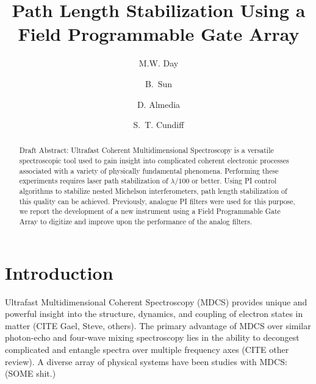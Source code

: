 \documentclass[letterpaper,12pt,amsmath,reprint,aip,jmp,onecolumn]{revtex4-1}
\begin{document}
\title{Path Length Stabilization Using a Field Programmable Gate Array}
\author{M.W. Day}
\author{B.~Sun}%
%

\author{D. Almedia}


\author{S.~T. Cundiff}

\begin{abstract}
Draft Abstract: Ultrafast Coherent Multidimensional Spectroscopy is a versatile spectroscopic tool used to gain insight into complicated coherent electronic processes associated with a variety of physically fundamental phenomena. Performing these experiments requires laser path stabilization of $\lambda / 100$ or better. Using PI control algorithms to stabilize nested Michelson interferometers, path length stabilization of this quality can be achieved. Previously, analogue PI filters were used for this purpose, we report the development of a new instrument using a Field Programmable Gate Array to digitize and improve upon the performance of the analog filters.
\end{abstract}
\maketitle

\section{Introduction}
\indent Ultrafast Multidimensional Coherent Spectroscopy (MDCS) provides unique and powerful insight into the structure, dynamics, and coupling of electron states in matter (CITE Gael, Steve, others). The primary advantage of MDCS over similar photon-echo and four-wave mixing spectroscopy lies in the ability to decongest complicated and entangle spectra over multiple frequency axes (CITE other review).  A diverse array of physical systems have been studies with MDCS: (SOME shit.) 
\end{document}

